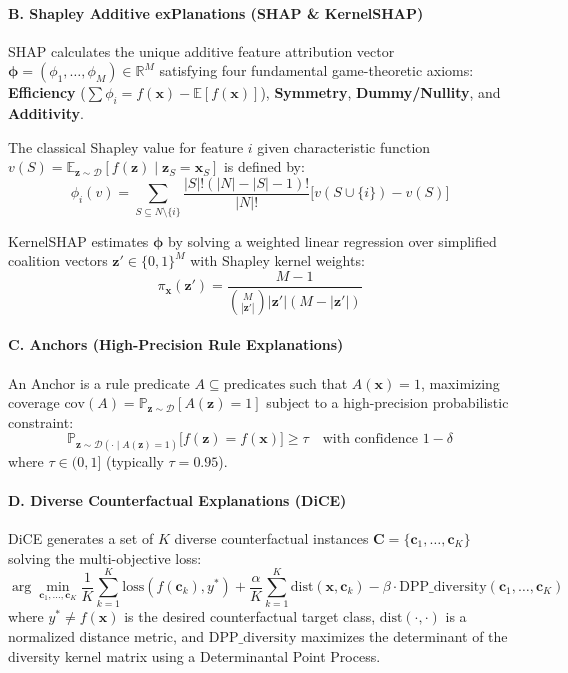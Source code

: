 \documentclass[
]{article}
\begin{document}
\paragraph{B. Shapley Additive exPlanations (SHAP \&
KernelSHAP)}\label{b.-shapley-additive-explanations-shap-kernelshap}

SHAP calculates the unique additive feature attribution vector
\(\boldsymbol{\phi} = (\phi_1, \dots, \phi_M) \in \mathbb{R}^M\)
satisfying four fundamental game-theoretic axioms: \textbf{Efficiency}
(\(\sum \phi_i = f(\mathbf{x}) - \mathbb{E}[f(\mathbf{x})]\)),
\textbf{Symmetry}, \textbf{Dummy/Nullity}, and \textbf{Additivity}.

The classical Shapley value for feature \(i\) given characteristic
function
\(v(S) = \mathbb{E}_{\mathbf{z} \sim \mathcal{D}}[f(\mathbf{z}) \mid \mathbf{z}_S = \mathbf{x}_S]\)
is defined by:
\[\phi_i(v) = \sum_{S \subseteq N \setminus \{i\}} \frac{|S|!(|N|-|S|-1)!}{|N|!} \Big[ v(S \cup \{i\}) - v(S) \Big]\]

KernelSHAP estimates \(\boldsymbol{\phi}\) by solving a weighted linear
regression over simplified coalition vectors
\(\mathbf{z}' \in \{0,1\}^M\) with Shapley kernel weights:
\[\pi_{\mathbf{x}}(\mathbf{z}') = \frac{M - 1}{\binom{M}{|\mathbf{z}'|} |\mathbf{z}'| (M - |\mathbf{z}'|)}\]

\paragraph{C. Anchors (High-Precision Rule
Explanations)}\label{c.-anchors-high-precision-rule-explanations}

An Anchor is a rule predicate \(A \subseteq \text{predicates}\) such
that \(A(\mathbf{x}) = 1\), maximizing coverage
\(\text{cov}(A) = \mathbb{P}_{\mathbf{z} \sim \mathcal{D}}[A(\mathbf{z}) = 1]\)
subject to a high-precision probabilistic constraint:
\[\mathbb{P}_{\mathbf{z} \sim \mathcal{D}(\cdot \mid A(\mathbf{z})=1)} \Big[ f(\mathbf{z}) = f(\mathbf{x}) \Big] \ge \tau \quad \text{with confidence } 1 - \delta\]
where \(\tau \in (0, 1]\) (typically \(\tau = 0.95\)).

\paragraph{D. Diverse Counterfactual Explanations
(DiCE)}\label{d.-diverse-counterfactual-explanations-dice}

DiCE generates a set of \(K\) diverse counterfactual instances
\(\mathbf{C} = \{\mathbf{c}_1, \dots, \mathbf{c}_K\}\) solving the
multi-objective loss:
\[\arg\min_{\mathbf{c}_1, \dots, \mathbf{c}_K} \frac{1}{K}\sum_{k=1}^K \text{loss}(f(\mathbf{c}_k), y^*) + \frac{\alpha}{K}\sum_{k=1}^K \text{dist}(\mathbf{x}, \mathbf{c}_k) - \beta \cdot \text{DPP\_diversity}(\mathbf{c}_1, \dots, \mathbf{c}_K)\]
where \(y^* \neq f(\mathbf{x})\) is the desired counterfactual target
class, \(\text{dist}(\cdot, \cdot)\) is a normalized distance metric,
and \(\text{DPP\_diversity}\) maximizes the determinant of the diversity
kernel matrix using a Determinantal Point Process.
\end{document}
